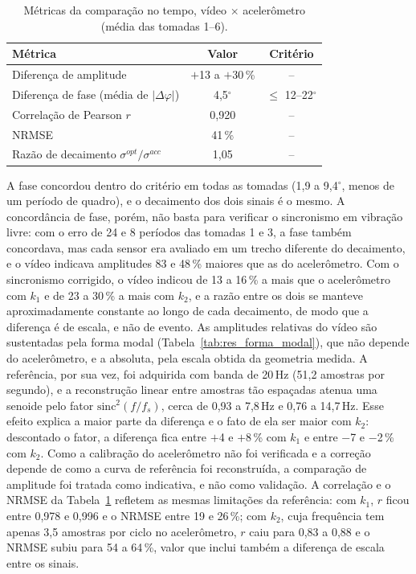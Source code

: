 \documentclass[a4paper,10pt,twocolumn]{article}
\begin{document}
\begin{table}[H]
    \centering
    \caption{Métricas da comparação no tempo, vídeo $\times$ acelerômetro (média das tomadas 1--6).}
    \label{tab:res_tempo}
    \small
    \begin{tabularx}{\columnwidth}{X c c}
        \toprule
        \textbf{Métrica} & \textbf{Valor} & \textbf{Critério} \\
        \midrule
        Diferença de amplitude & $+$13 a $+$30\,\% & -- \\
        Diferença de fase (média de $|\Delta\varphi|$) & 4,5$^\circ$ & $\leq$ 12--22$^\circ$ \\
        Correlação de Pearson $r$ & 0,920 & -- \\
        NRMSE & 41\,\% & -- \\
        Razão de decaimento $\sigma^{opt}/\sigma^{acc}$ & 1,05 & -- \\
        \bottomrule
    \end{tabularx}
\end{table}

A fase concordou dentro do critério em todas as tomadas (1,9 a 9,4$^\circ$, menos de um período de quadro), e o decaimento dos dois sinais é o mesmo. A concordância de fase, porém, não basta para verificar o sincronismo em vibração livre: com o erro de 24 e 8 períodos das tomadas 1 e 3, a fase também concordava, mas cada sensor era avaliado em um trecho diferente do decaimento, e o vídeo indicava amplitudes 83 e 48\,\% maiores que as do acelerômetro. Com o sincronismo corrigido, o vídeo indicou de 13 a 16\,\% a mais que o acelerômetro com $k_1$ e de 23 a 30\,\% a mais com $k_2$, e a razão entre os dois se manteve aproximadamente constante ao longo de cada decaimento, de modo que a diferença é de escala, e não de evento. As amplitudes relativas do vídeo são sustentadas pela forma modal (Tabela~\ref{tab:res_forma_modal}), que não depende do acelerômetro, e a absoluta, pela escala obtida da geometria medida. A referência, por sua vez, foi adquirida com banda de 20\,Hz (51,2 amostras por segundo), e a reconstrução linear entre amostras tão espaçadas atenua uma senoide pelo fator $\mathrm{sinc}^2(f/f_s)$, cerca de 0,93 a 7,8\,Hz e 0,76 a 14,7\,Hz. Esse efeito explica a maior parte da diferença e o fato de ela ser maior com $k_2$: descontado o fator, a diferença fica entre $+$4 e $+$8\,\% com $k_1$ e entre $-$7 e $-$2\,\% com $k_2$. Como a calibração do acelerômetro não foi verificada e a correção depende de como a curva de referência foi reconstruída, a comparação de amplitude foi tratada como indicativa, e não como validação. A correlação e o NRMSE da Tabela~\ref{tab:res_tempo} refletem as mesmas limitações da referência: com $k_1$, $r$ ficou entre 0,978 e 0,996 e o NRMSE entre 19 e 26\,\%; com $k_2$, cuja frequência tem apenas 3,5 amostras por ciclo no acelerômetro, $r$ caiu para 0,83 a 0,88 e o NRMSE subiu para 54 a 64\,\%, valor que inclui também a diferença de escala entre os sinais.
\end{document}
